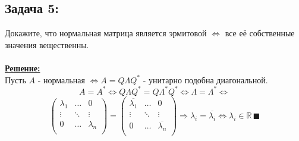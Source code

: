 \documentclass[a4paper,12pt,titlepage,final]{article}
\begin{document}
\subsection*{Задача 5:}
\noindent Докажите, что нормальная матрица является эрмитовой $\Leftrightarrow$ все её собственные значения вещественны.\\ \\
\textbf{\underline{Решение:}} \\
Пусть $A$ - нормальная $\Leftrightarrow A = Q\Lambda Q^*$ - унитарно подобна диагональной.
$$ A = A^* \Leftrightarrow Q\Lambda Q^* = Q\Lambda^* Q^* \Leftrightarrow \Lambda = \Lambda^* \Leftrightarrow$$ 
$$\begin{pmatrix}
    \lambda_1 & \ldots & 0 \\
    \vdots & \ddots & \vdots \\
    0 & \ldots & \lambda_n \\
\end{pmatrix} = 
\begin{pmatrix}
    \overline{\lambda_1} & \ldots & 0 \\
    \vdots & \ddots & \vdots \\
    0 & \ldots & \overline{\lambda_n} \\
\end{pmatrix} \Rightarrow \lambda_i = \overline{\lambda_i} \Leftrightarrow \lambda_i \in \mathbb{R} \, \blacksquare$$


\end{document}
